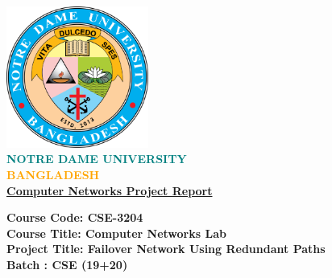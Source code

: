 \documentclass[12pt]{report}
\begin{document}
\begin{titlepage}					%
\begin{center}
    \includegraphics[width=0.35\textwidth]{logo.png} \\
    \vspace{0.5cm}
    \textbf{\Huge \textcolor{teal}{NOTRE DAME} \textcolor{teal}{UNIVERSITY}} \\
    \vspace{0.5cm}
    \textbf{\Huge \textcolor{orange}{BANGLADESH}} \\
    
    \vspace{0.9cm}
    \textbf{\Huge \underline{Computer Networks Project Report}} \\
    
    \vspace{1.5em}
    \begin{flushleft}
    	\textbf{\Large Course Code: CSE-3204} \\
		\vspace{0.3cm}        
        \textbf{\Large Course Title: Computer Networks Lab} \\
        \vspace{0.3cm}
        \textbf{\Large Project Title: Failover Network Using Redundant Paths} \\
		\vspace{0.3cm}        
        \textbf{\Large Batch : CSE (19+20)}        
    \end{flushleft}
    

\end{center}
\end{titlepage}
\end{document}
